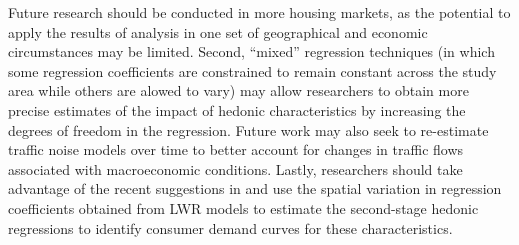 \documentclass{article}\usepackage{graphicx, color}
\begin{document}
Future research should be conducted in more housing markets, as the potential to apply the results of analysis in one set of geographical and economic circumstances may be limited. Second, ``mixed'' regression techniques (in which some regression coefficients are constrained to remain constant across the study area while others are alowed to vary) may allow researchers to obtain more precise estimates of the impact of hedonic characteristics by increasing the degrees of freedom in the regression. Future work may also seek to re-estimate traffic noise models over time to better account for changes in traffic flows associated with macroeconomic conditions. Lastly, researchers should take advantage of the recent suggestions in \citet{Carruthers2010} and use the spatial variation in regression coefficients obtained from LWR models to estimate the second-stage hedonic regressions to identify consumer demand curves for these characteristics.

\begin{singlespace}


\end{singlespace}
\end{document}
